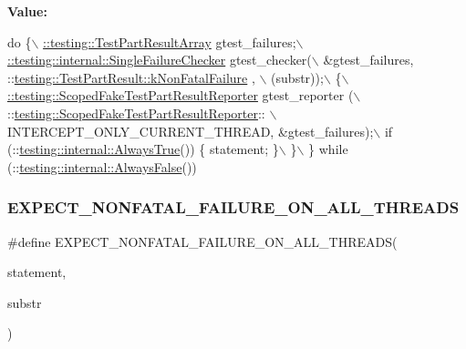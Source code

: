 {\bfseries Value\+:}
\begin{DoxyCode}
\textcolor{keywordflow}{do} \{\(\backslash\)
    \hyperlink{classtesting_1_1_test_part_result_array}{::testing::TestPartResultArray} gtest\_failures;\(\backslash\)
    \hyperlink{classtesting_1_1internal_1_1_single_failure_checker}{::testing::internal::SingleFailureChecker} gtest\_checker(\(\backslash\)
        &gtest\_failures, ::\hyperlink{classtesting_1_1_test_part_result_a65ae656b33fdfdfffaf34858778a52d5a00a755614f8ec3f78b2e951f8c91cd92}{testing::TestPartResult::kNonFatalFailure}
      , \(\backslash\)
        (substr));\(\backslash\)
    \{\(\backslash\)
      \hyperlink{classtesting_1_1_scoped_fake_test_part_result_reporter}{::testing::ScopedFakeTestPartResultReporter} gtest\_reporter
      (\(\backslash\)
          ::\hyperlink{classtesting_1_1_scoped_fake_test_part_result_reporter}{testing::ScopedFakeTestPartResultReporter}:: \(\backslash\)
          INTERCEPT\_ONLY\_CURRENT\_THREAD, &gtest\_failures);\(\backslash\)
      if (::\hyperlink{namespacetesting_1_1internal_a922c9da63cd4bf94fc473b9ecac76414}{testing::internal::AlwaysTrue}()) \{ statement; \}\(\backslash\)
    \}\(\backslash\)
  \} \textcolor{keywordflow}{while} (::\hyperlink{namespacetesting_1_1internal_a4b24c851ab13569b1b15b3d259b60d2e}{testing::internal::AlwaysFalse}())
\end{DoxyCode}
\mbox{\label{gtest-spi_8h_a9f4cf1f150fe9facfc4cbf0bae646ee9}} 
\subsubsection{\texorpdfstring{E\+X\+P\+E\+C\+T\+\_\+\+N\+O\+N\+F\+A\+T\+A\+L\+\_\+\+F\+A\+I\+L\+U\+R\+E\+\_\+\+O\+N\+\_\+\+A\+L\+L\+\_\+\+T\+H\+R\+E\+A\+DS}{EXPECT\_NONFATAL\_FAILURE\_ON\_ALL\_THREADS}}
{\footnotesize\ttfamily \#define E\+X\+P\+E\+C\+T\+\_\+\+N\+O\+N\+F\+A\+T\+A\+L\+\_\+\+F\+A\+I\+L\+U\+R\+E\+\_\+\+O\+N\+\_\+\+A\+L\+L\+\_\+\+T\+H\+R\+E\+A\+DS(\begin{DoxyParamCaption}\item[{}]{statement,  }\item[{}]{substr }\end{DoxyParamCaption})}

